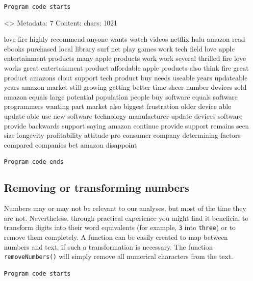 \texttt{Program\ code\ starts}

\begin{Shaded}
\begin{Highlighting}[]
\OtherTok{\textless{}{-}} 

\NormalTok{(docs[[}\NormalTok{]])}
\end{Highlighting}
\end{Shaded}

\textless{}\textgreater{} Metadata: 7 Content: chars: 1021

love fire highly recommend anyone wants watch videos netflix hulu amazon
read ebooks purchased local library surf net play games work tech field
love apple entertainment products many apple products work work several
thrilled fire love works great entertainment product affordable apple
products also think fire great product amazons clout support tech
product buy needs useable years updateable years amazon market still
growing getting better time sheer number devices sold amazon equals
large potential population people buy software equals software
programmers wanting part market also biggest frustration older device
able update able use new software technology manufacturer update devices
software provide backwards support saying amazon continue provide
support remains seen size longevity profitability attitude pro consumer
company determining factors compared companies bet amazon disappoint

\texttt{Program\ code\ ends}

\subsection{Removing or transforming numbers}\label{numbers-removal-or-transformation}

Numbers may or may not be relevant to our analyses, but most of the time
they are not. Nevertheless, through practical experience you might find it
beneficial to transform digits into their word equivalents (for example, \texttt{3} into \texttt{three}) or to remove them completely. A
function can be easily created to map between numbers and text, if such
a transformation is necessary. The function \texttt{removeNumbers()}
will simply remove all numerical characters from the text.

\texttt{Program\ code\ starts}

